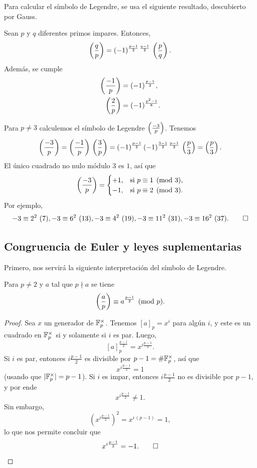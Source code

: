 Para calcular el símbolo de Legendre, se usa el siguiente resultado, descubierto
por Gauss.

\begin{teorema}
  Sean $p$ y $q$ diferentes primos impares. Entonces,
  \[ \left(\frac{q}{p}\right) =
     (-1)^{\frac{p-1}{2}\,\frac{q-1}{2}}\,\left(\frac{p}{q}\right).\]
  Además, se cumple
  \begin{align*}
    \left(\frac{-1}{p}\right) & = (-1)^{\frac{p-1}{2}},\\
    \left(\frac{2}{p}\right) & = (-1)^{\frac{p^2-1}{8}}.
  \end{align*}
\end{teorema}

\begin{ejemplo}
  \label{ejemplo:legendre--3}
  Para $p \ne 3$ calculemos el símbolo de Legendre $\left(\frac{-3}{p}\right)$.
  Tenemos
  \[ \left(\frac{-3}{p}\right) = \left(\frac{-1}{p}\right)\,\left(\frac{3}{p}\right) =
       (-1)^{\frac{p-1}{2}}\,(-1)^{\frac{3-1}{2}\,\frac{p-1}{2}}\,\left(\frac{p}{3}\right) =
         \left(\frac{p}{3}\right). \]
  El único cuadrado no nulo módulo $3$ es $1$, así que
  \[ \left(\frac{-3}{p}\right) = \begin{cases}
    +1, & \text{si } p\equiv 1 \pmod{3},\\
    -1, & \text{si } p\equiv 2 \pmod{3}.
  \end{cases} \]
  Por ejemplo,
  \[ -3 \equiv 2^2 ~ (7), -3 \equiv 6^2 ~ (13), -3 \equiv 4^2 ~ (19), -3 \equiv 11^2 ~ (31), -3 \equiv 16^2 ~ (37). \qedhere \]
\end{ejemplo}

\subsection{Congruencia de Euler y leyes suplementarias}

Primero, nos servirá la siguiente interpretación del símbolo de Legendre.

\begin{lema}
  Para $p \ne 2$ y $a$ tal que $p \nmid a$ se tiene
  $$\left(\frac{a}{p}\right) \equiv a^{\frac{p-1}{2}} \pmod{p}.$$

  \begin{proof}
    Sea $x$ un generador de $\mathbb{F}_p^\times$. Tenemos $[a]_p = x^i$ para algún
    $i$, y este es un cuadrado en $\mathbb{F}_p^\times$ si y solamente si $i$ es
    par. Luego,
    $$[a]_p^{\frac{p-1}{2}} = x^{i\frac{p-1}{2}}.$$
    Si $i$ es par, entonces $i\frac{p-1}{2}$ es divisible por
    $p-1 = \#\mathbb{F}_p^\times$, así que
    $$x^{i\frac{p-1}{2}} = 1$$
    (usando que $|\mathbb{F}_p^\times| = p-1$). Si $i$ es impar, entonces
    $i\frac{p-1}{2}$ no es divisible por $p-1$, y por ende
    $$x^{i\frac{p-1}{2}} \ne 1.$$
    Sin embargo,
    $$\left(x^{i\frac{p-1}{2}}\right)^2 = x^{i\,(p-1)} = 1,$$
    lo que nos permite concluir que
    \[ x^{i\frac{p-1}{2}} = -1. \qedhere \]
  \end{proof}
\end{lema}


